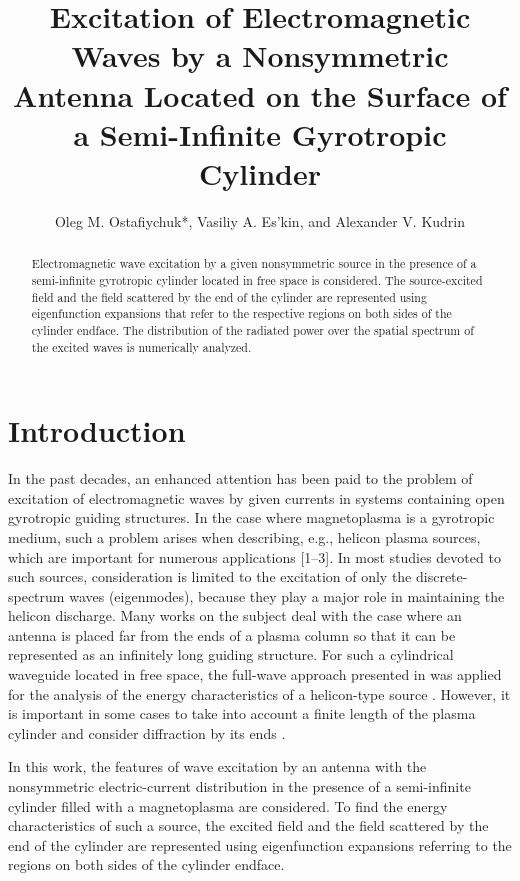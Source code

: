 \documentclass[summary]{URSIGASS2020}
\title{Excitation of Electromagnetic Waves by a Nonsymmetric Antenna Located on the Surface of a Semi-Infinite Gyrotropic Cylinder}
\author{Oleg M. Ostafiychuk*, Vasiliy A. Es'kin, and Alexander V. Kudrin  }
\affiliation{%
  University of Nizhny Novgorod, 23 Gagarin Ave., Nizhny Novgorod 603950, Russia
}
\begin{document}
\maketitle

\begin{abstract}
Electromagnetic wave excitation by a given nonsymmetric source in the presence of a semi-infinite gyrotropic cylinder located in free space is considered.
The source-excited field and the field scattered by the end of the cylinder are represented using eigenfunction expansions that refer to the respective regions on both sides of the cylinder endface.
The distribution of the radiated power over the spatial spectrum of the excited waves is numerically analyzed.
 
\end{abstract}

\section{Introduction}

In the past decades, an enhanced attention has been paid to the problem of excitation of electromagnetic waves by given currents in systems containing open gyrotropic guiding structures.
In the case where magnetoplasma is a gyrotropic medium, such a problem arises when describing, e.g., helicon plasma sources, which are important for numerous applications [1--3].
In most studies devoted to such sources, consideration is limited to the excitation of only the discrete-spectrum waves (eigenmodes),
because they play a major role in maintaining the helicon discharge.
Many works on the subject deal with the case where an antenna is placed far from the ends of a plasma column so that it can be represented as an infinitely long guiding structure.
For such a cylindrical waveguide located in free space, the full-wave approach presented in \cite{EskinPIERS2017_meth} was applied for the analysis of the energy characteristics of a helicon-type source \cite{OstafEskin_APRASC2019}.
However, it is important in some cases to take into account a finite length of the plasma cylinder and consider diffraction by its ends \cite{Amatucci2011}.

In this work, the features of wave excitation by an antenna with the nonsymmetric electric-current distribution in the presence of a semi-infinite cylinder filled with a magnetoplasma are considered.
To find the energy characteristics of such a source, the excited field and the field scattered by the end of the cylinder are represented using eigenfunction expansions referring to the regions on both sides of the cylinder endface.
\end{document}
